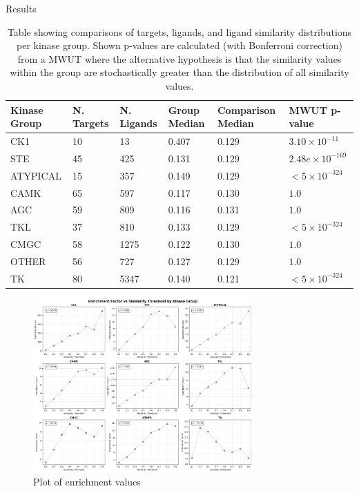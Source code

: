 \documentclass[final]{beamer}
\newlength{\colwidth}
\begin{document}
\begin{frame}[t]
\begin{columns}[t]
\begin{column}{\colwidth}
\begin{block}{Results}
    \begin{table}[!ht]
    \centering
    \small
    \begin{tabular}{l|l|l|l|l|l}
        \hline
        \textbf{Kinase Group} & \textbf{N. Targets} & \textbf{N. Ligands} & \textbf{Group Median} &\textbf{Comparison Median} & \textbf{MWUT p-value} \\ \hline
        CK1 & 10 & 13 & 0.407 & 0.129 & $3.10 \times 10^{-11}$ \\ \hline
        STE & 45 & 425 & 0.131 & 0.129 & $2.48e \times 10^{-169}$ \\ \hline
        ATYPICAL & 15 & 357 & 0.149 & 0.129 & $< 5 \times 10^{-324}$ \\ \hline
        CAMK & 65 & 597 & 0.117 & 0.130 & $1.0$ \\ \hline
        AGC & 59 & 809 & 0.116 & 0.131 & $1.0$ \\ \hline
        TKL & 37 & 810 & 0.133 & 0.129 & $< 5 \times 10^{-324}$ \\ \hline
        CMGC & 58 & 1275 & 0.122 & 0.130 & $1.0$ \\ \hline
        OTHER & 56 & 727 & 0.127 & 0.129 & $1.0$ \\ \hline
        TK & 80 & 5347 & 0.140 & 0.121 & $< 5 \times 10^{-324}$ \\ \hline
    \end{tabular}
    \caption{Table showing comparisons of targets, ligands, and ligand similarity distributions per kinase group. Shown p-values are calculated (with Bonferroni correction) from a MWUT where the alternative hypothesis is that the similarity values within the group are stochastically greater than the distribution of all similarity values.}\label{results_table}
    \end{table}

    \begin{figure}
        \centering
        \includegraphics[width=0.75\textwidth]{figures/enrichment_factor_by_group.png}
        \caption{Plot of enrichment values}
        \label{enrichment_plot}
    \end{figure}


\end{block}
\end{column}
\end{columns}
\end{frame}
\end{document}

